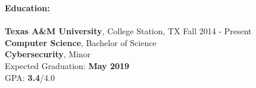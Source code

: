 \documentclass[12pt]{article}
\begin{document}
\begin{flushleft}
    \begin{outline}[compactitem]

        \newlength{\upspacelength}
        \setlength{\upspacelength}{-0.6px}
        \newcommand{\upspace}{\vspace{\upspacelength}}
        \newcommand{\zzz}[1]{\upspace \0 \textbf{#1} \\ \vspace{-0.8\baselineskip} \hrulefill \vspace{-2px} \\ }
        \let\oldOne\1\let\oldTwo\2\let\oldThree\3\let\oldFour\4
        \renewcommand{\1}{\upspace \oldOne  }
        \renewcommand{\2}{\upspace \oldTwo  }
        \renewcommand{\3}{\upspace \oldThree}
        \renewcommand{\4}{\upspace \oldFour }



        \zzz{Education:}
        \1 \textbf{Texas A\&M University}, College Station, TX \hfill Fall 2014 - Present
        \\ \textbf{Computer Science}, Bachelor of Science
        \\ \textbf{Cybersecurity}, Minor
        \\ Expected Graduation: \textbf{May 2019}
        \\ GPA\@:  \textbf{3.4}/4.0


\end{outline}
\end{flushleft}
\end{document}
